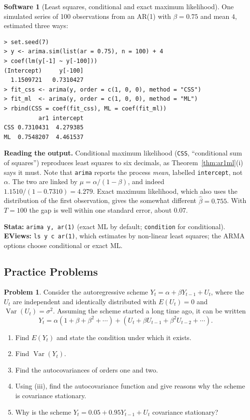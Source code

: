 \documentclass[11pt,a4paper]{article}
\numberwithin{equation}{section}
\DeclareMathOperator{\Var}{Var}
\theoremstyle{definition}
\newtheorem{software}[thm]{Software}
\newtheorem{problemx}{Problem}[subsection]
\newenvironment{problem}{\begin{problemx}}{\end{problemx}}
\begin{document}
\begin{software}[Least squares, conditional and exact maximum likelihood]
\label{sw:arima}
One simulated series of 100 observations from an AR(1) with $\beta = 0.75$ and mean $4$, estimated three ways:
{\small\begin{verbatim}
> set.seed(7)
> y <- arima.sim(list(ar = 0.75), n = 100) + 4
> coef(lm(y[-1] ~ y[-100]))
(Intercept)     y[-100]
  1.1509721   0.7310427
> fit_css <- arima(y, order = c(1, 0, 0), method = "CSS")
> fit_ml  <- arima(y, order = c(1, 0, 0), method = "ML")
> rbind(CSS = coef(fit_css), ML = coef(fit_ml))
          ar1 intercept
CSS 0.7310431  4.279385
ML  0.7548207  4.461537
\end{verbatim}}
\textbf{Reading the output.} Conditional maximum likelihood (\texttt{CSS}, ``conditional sum of squares'') reproduces least squares to six
decimals, as Theorem~\ref{thm:ar1ml}(i) says it must. Note that \texttt{arima} reports the process \emph{mean}, labelled \texttt{intercept}, not $\alpha$.
The two are linked by $\mu = \alpha/(1 - \beta)$, and indeed $1.1510/(1 - 0.7310) = 4.279$. Exact maximum likelihood, which also uses the distribution of
the first observation, gives the somewhat different $\hat\beta = 0.755$. With $T = 100$ the gap is well within one standard error, about $0.07$.

\textbf{Stata:} \texttt{arima y, ar(1)} (exact ML by default; \texttt{condition} for conditional). \textbf{EViews:} \texttt{ls y c ar(1)}, which
estimates by non-linear least squares; the ARMA options choose conditional or exact ML.
\end{software}

\subsection{Practice Problems}

\begin{problem}
Consider the autoregressive scheme $Y_t = \alpha + \beta Y_{t-1} + U_t$, where the $U_t$ are independent and identically distributed with
$E(U_t) = 0$ and $\Var(U_t) = \sigma^2$. Assuming the scheme started a long time ago, it can be written
\[
Y_t = \alpha(1 + \beta + \beta^2 + \cdots) + (U_t + \beta U_{t-1} + \beta^2U_{t-2} + \cdots) .
\]
\begin{enumerate}[label=(\roman*)]
\item Find $E(Y_t)$ and state the condition under which it exists.
\item Find $\Var(Y_t)$.
\item Find the autocovariances of orders one and two.
\item Using (iii), find the autocovariance function and give reasons why the scheme is covariance stationary.
\item Why is the scheme $Y_t = 0.05 + 0.95Y_{t-1} + U_t$ covariance stationary?
\end{enumerate}
\end{problem}
\end{document}
